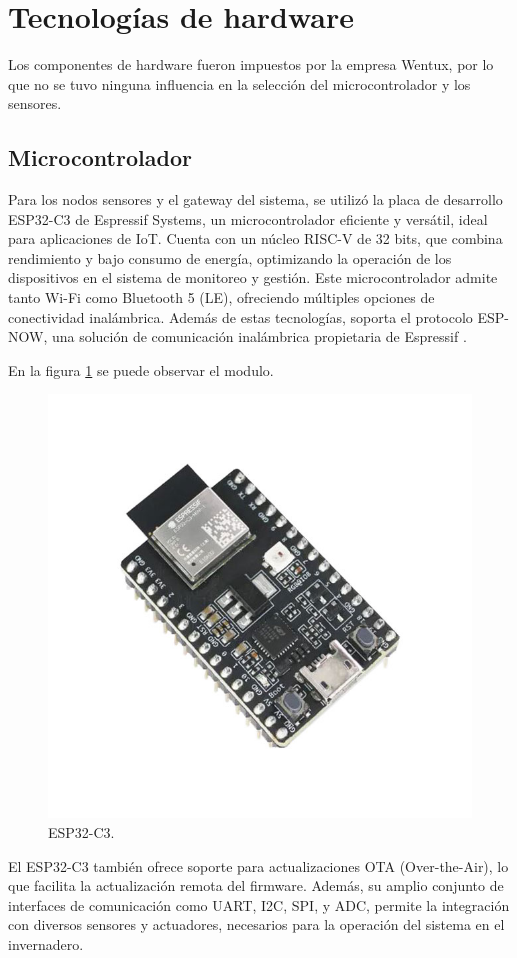 \section{Tecnologías de hardware}

Los componentes de hardware fueron impuestos por la empresa Wentux, por lo que no se tuvo ninguna influencia en la selección del microcontrolador y los sensores.

\subsection{Microcontrolador}

Para los nodos sensores y el gateway del sistema, se utilizó la placa de desarrollo ESP32-C3 de Espressif Systems, un microcontrolador eficiente y versátil, ideal para aplicaciones de IoT. Cuenta con un núcleo RISC-V de 32 bits, que combina rendimiento y bajo consumo de energía, optimizando la operación de los dispositivos en el sistema de monitoreo y gestión.
Este microcontrolador admite tanto Wi-Fi como Bluetooth 5 (LE), ofreciendo múltiples opciones de conectividad inalámbrica. Además de estas tecnologías, soporta el protocolo ESP-NOW, una solución de comunicación inalámbrica propietaria de Espressif \citep{esp32c3}.

En la figura \ref{fig:esp32c3} se puede observar el modulo.

\begin{figure}[htpb]
    \centering
    \includegraphics[width=.3\textwidth]{./Figures/esp32c3.png}
    \caption{ESP32-C3.}
    \label{fig:esp32c3}
\end{figure}

El ESP32-C3 también ofrece soporte para actualizaciones OTA (Over-the-Air), lo que facilita la actualización remota del firmware. Además, su amplio conjunto de interfaces de comunicación como UART, I2C, SPI, y ADC, permite la integración con diversos sensores y actuadores, necesarios para la operación del sistema en el invernadero. 

